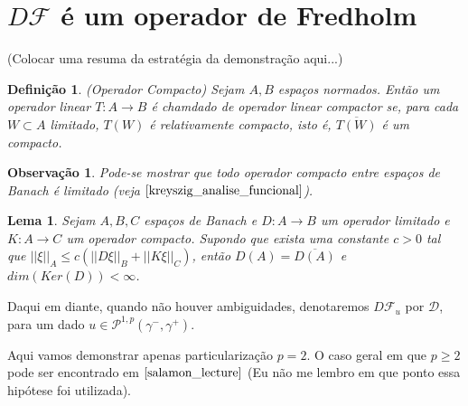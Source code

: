 \documentclass[12pt]{book}
\newtheorem{lema}[teorema]{Lema}
\newtheorem{definicao}[teorema]{Definição}
\newtheorem{observacao}[teorema]{Observação}
\newcommand{\caminhosexponenciaisconectantes}[2]{\mathcal{P}^{1,p}(#1, #2)}
\newcommand{\caminhosexponenciaisconectantespadrao}{\caminhosexponenciaisconectantes{\gamma^{-}}{\gamma^{+}}}
\newcommand{\diferencialfloerabrev}{\mathcal{D}}
\newcommand{\operadorFloer}{\mathcal{F}}
\newcommand{\norma}[1]{||#1||}
\newcommand{\normasubscrito}[2]{\norma{#1}_{#2}}
\newcommand{\vermelho}[1]{{\color{red}#1}}
\begin{document}
	\section{$D\operadorFloer$ é um operador de Fredholm}
	\vermelho{(Colocar uma resuma da estratégia da demonstração aqui...)}
	\begin{definicao}\label{definicao_operador_compacto}
		(Operador Compacto) Sejam $A, B$ espaços normados. Então um operador linear $T:A\to B$ é chamdado de operador linear compactor se, para cada $W \subset A$ limitado, $T(W)$ é relativamente compacto, isto é, $\overline{T(W)} $ é um compacto.
	\end{definicao}
	
	\begin{observacao}\label{observacao_operador_compacto_limitado}
		Pode-se mostrar que todo operador compacto entre espaços de Banach é limitado (veja $\cite{kreyszig_analise_funcional}$).
	\end{observacao}
	
	\begin{lema}\label{lema_desigualdade_operador_compacto}
		Sejam $A,B,C$ espaços de Banach e $D:A\to B$ um operador limitado e $K:A \to C$ um operador compacto. Supondo que exista uma constante $c>0$ tal que $\normasubscrito{\xi}{A} \leq c(\normasubscrito{D\xi}{B} + \normasubscrito{K\xi}{C})$, então $D(A) = \overline{D(A)}$ e $dim(Ker(D)) <\infty$.
	\end{lema}
	
	Daqui em diante, quando não houver ambiguidades, denotaremos $D\operadorFloer_{u}$ por $\diferencialfloerabrev$, para um dado $u\in \caminhosexponenciaisconectantespadrao$.
	
	Aqui vamos demonstrar apenas particularização $p=2$. O caso geral em que $p\geq 2$ pode ser encontrado em $\cite{salamon_lecture}$ \vermelho{(Eu não me lembro em que ponto essa hipótese foi utilizada)}.
	
\end{document}
